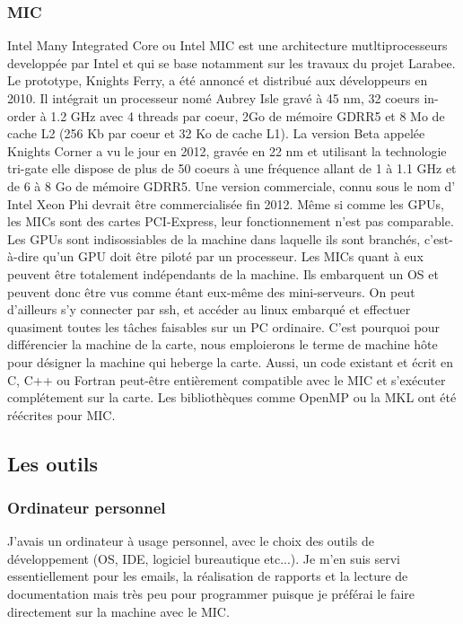 \documentclass[11pt]{article}
\begin{document}
			\subsubsection{MIC}
			Intel \og{} Many Integrated Core \fg{} ou Intel MIC est une architecture mutltiprocesseurs developpée par Intel et qui se base notamment 
			sur les travaux du projet Larabee. \newline
			Le prototype, Knights Ferry, a été annoncé et distribué aux développeurs en 2010. Il intégrait un processeur nomé  \og{} Aubrey Isle \fg{} gravé 
			à 45 nm, 32 coeurs \og{} in-order \fg{} à 1.2 GHz avec 4 threads par coeur, 2Go de mémoire GDRR5 et 8 Mo de cache L2 (256 Kb par coeur et 32 
			Ko de cache L1). \newline
			La version Beta appelée Knights Corner a vu le jour en 2012, gravée en 22 nm et utilisant la technologie tri-gate elle dispose de plus de 
			50 coeurs à une fréquence allant de 1 à 1.1 GHz et de 6 à 8 Go de mémoire GDRR5. \newline
			Une version commerciale, connu sous le nom d' Intel Xeon Phi devrait être commercialisée fin 2012. \newline
			\newline
			Même si comme les GPUs, les MICs sont des cartes PCI-Express, leur fonctionnement n'est pas comparable. Les GPUs sont indisossiables de la 
			machine dans laquelle ils sont branchés, c'est-à-dire qu'un GPU doit être piloté par un processeur. Les MICs quant à eux peuvent être 
			totalement indépendants de la machine. Ils embarquent un {\micro}OS et peuvent donc être vus comme étant eux-même des mini-serveurs. On peut 
			d'ailleurs s'y connecter par ssh, et accéder au linux embarqué et effectuer quasiment toutes les tâches faisables sur un PC ordinaire. \newline
			C'est pourquoi pour différencier la machine de la carte, nous emploierons le terme de machine hôte pour désigner la machine qui heberge la carte.
			Aussi, un code existant et écrit en C, C++ ou Fortran peut-être entièrement compatible avec le MIC et s'exécuter complétement sur la carte. 
			Les bibliothèques comme OpenMP ou la MKL ont été réécrites pour MIC.
		\subsection{Les outils}
			\subsubsection{Ordinateur personnel}
			J'avais un ordinateur à usage personnel, avec le choix des outils de développement (OS, IDE, logiciel bureautique etc...).
			Je m'en suis servi essentiellement pour les emails, la réalisation de rapports et la lecture de documentation mais très peu pour programmer 
			puisque je préférai le faire directement sur la machine avec le MIC.
\end{document}
